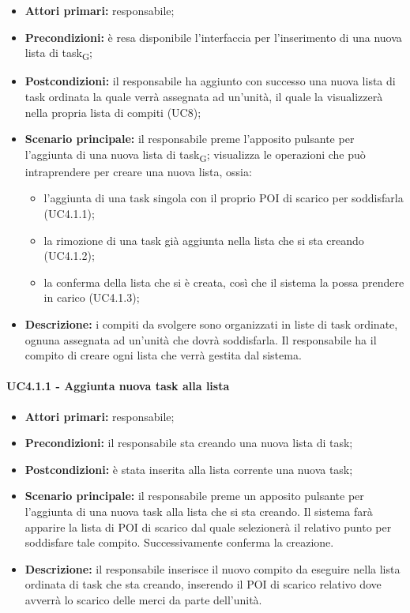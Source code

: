 \begin{itemize}
	\item 	\textbf{Attori primari:} responsabile;
	\item 	\textbf{Precondizioni:} è resa disponibile l'interfaccia per l'inserimento di una nuova lista di task\textsubscript{G}; 
	\item 	\textbf{Postcondizioni:} il responsabile ha aggiunto con successo una nuova lista di task ordinata la quale verrà assegnata ad un'unità, il quale la visualizzerà nella propria lista di compiti (UC8);
	\item 	\textbf{Scenario principale:} il responsabile preme l'apposito pulsante per l'aggiunta di una nuova lista di task\textsubscript{G}; visualizza le operazioni che può intraprendere per creare una nuova lista, ossia:
	\begin{itemize}
		\item l'aggiunta di una task singola con il proprio POI di scarico per soddisfarla (UC4.1.1);
		\item la rimozione di una task già aggiunta nella lista che si sta creando (UC4.1.2);
		\item la conferma della lista che si è creata, così che il sistema la possa prendere in carico (UC4.1.3);
	\end{itemize}
	\item 	\textbf{Descrizione:} i compiti da svolgere sono organizzati in liste di task ordinate, ognuna assegnata ad un'unità che dovrà soddisfarla. Il responsabile ha il compito di creare ogni lista che verrà gestita dal sistema.
\end{itemize}

\paragraph{UC4.1.1 - Aggiunta nuova task alla lista}
\begin{itemize}
	\item 	\textbf{Attori primari:} responsabile;
	\item 	\textbf{Precondizioni:} il responsabile sta creando una nuova lista di task;
	\item 	\textbf{Postcondizioni:} è stata inserita alla lista corrente una nuova task;
	\item 	\textbf{Scenario principale:} il responsabile preme un apposito pulsante per l'aggiunta di una nuova task alla lista che si sta creando. Il sistema farà apparire la lista di POI di scarico dal quale selezionerà il relativo punto per soddisfare tale compito. Successivamente conferma la creazione.
	\item 	\textbf{Descrizione:} il responsabile inserisce il nuovo compito da eseguire nella lista ordinata di task che sta creando, inserendo il POI di scarico relativo dove avverrà lo scarico delle merci da parte dell'unità.
	
\end{itemize}


